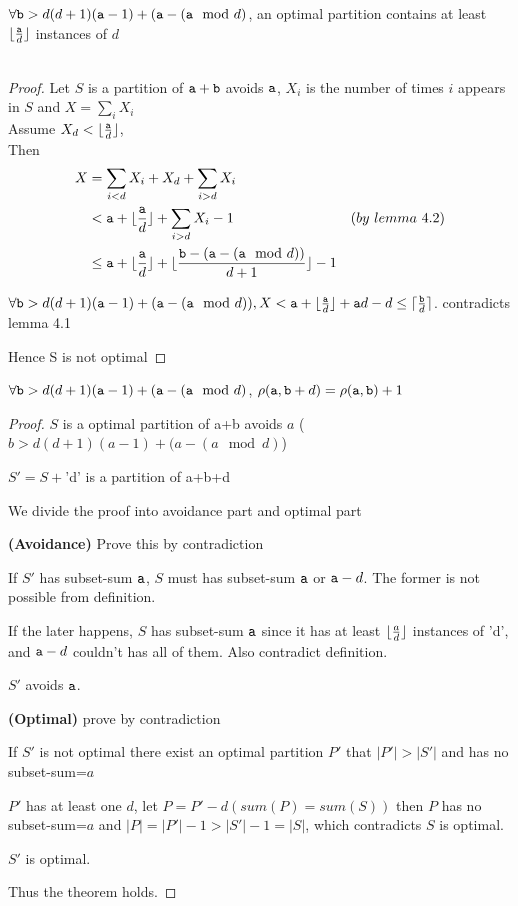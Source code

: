\begin{theorem} 
$\forall \mathtt{b}>d(d+1)(\mathtt{a}-1)  + (\mathtt{a} - (\mathtt{a}\mod d)$, an optimal partition contains at least $\lfloor{\frac{\mathtt{a}}{d}}\rfloor$ instances of $d$ \\ \\
\end{theorem}

\begin{proof} 
    Let $S$ is a partition of $\mathtt{a}+\mathtt{b}$ avoids $\mathtt{a}$,   $X_i$ is the number of times $i$ appears in $S$  and  $X = \sum_i{X_i}$  \\  

    Assume $X_d<\lfloor{\frac{\mathtt{a}}{d}} \rfloor $, \\

    Then 
    \begin{align*}
     X&=\sum_{i<d}{X_i}+X_d+\sum_{i>d}{X_i}&\\
      &<\mathtt{a}+\lfloor\frac{\mathtt{a}}{d}\rfloor   +\sum_{i>d}{X_i} -1  &(by\ lemma\ 4.2)\\
      &\leq \mathtt{a}+ \lfloor\frac{\mathtt{a}}{d}\rfloor   +\lfloor{\frac{\mathtt{b}-(\mathtt{a}- (\mathtt{a}\mod d))}{d+1}}\rfloor  -1&
    \end{align*}

     $\forall \mathtt{b}>d(d+1)(\mathtt{a}-1) + (\mathtt{a} - (\mathtt{a}\mod d)), \\
     X<\mathtt{a}+\lfloor\frac{\mathtt{a}}{d}\rfloor + \mathtt{a} d -d \leq \lceil\frac{\mathtt{b}}{d}\rceil$.    contradicts lemma 4.1

    Hence  S is not optimal
\end{proof}

\begin{theorem}
	$\forall \mathtt{b}>d(d+1)(\mathtt{a}-1)  + (\mathtt{a} - (\mathtt{a}\mod d)$, $\rho(\mathtt{a},\mathtt{b}+d)=\rho(\mathtt{a},\mathtt{b})+1$
\end{theorem}

\begin{proof}
    $S$ is a optimal partition of a+b avoids $a$ ($b>d(d+1)(a-1)  + (a - (a\mod d)$)
    
    $S'=S+$'d' is a partition of a+b+d 

    We divide the proof into avoidance part and optimal part

    {\bf(Avoidance)}
    Prove this by contradiction

    If $S'$ has subset-sum $\mathtt{a}$, $S$ must has subset-sum $\mathtt{a}$ or $\mathtt{a}-d$. The former is not possible from definition. 

    If the later happens, $S$ has subset-sum $\mathtt{a}$ since it has at least $\lfloor{\frac{a}{d}}\rfloor$ instances of 'd', and $\mathtt{a}-d$ couldn't has all of them.
    Also contradict definition.

    $S'$ avoids $\mathtt{a}$.

    {\bf(Optimal)}
        prove by contradiction

        If $S'$ is not optimal there exist an optimal partition $P'$ that $|P'|>|S'|$ and has no subset-sum=$a$

        $P'$ has at least one $d$, let $P=P'-d(sum(P)=sum(S))$ then $P$ has no subset-sum=$a$ and $|P|=|P'|-1>|S'|-1=|S|$, which contradicts $S$ is optimal.

        $S'$ is optimal.

    Thus the theorem holds.
\end{proof}


